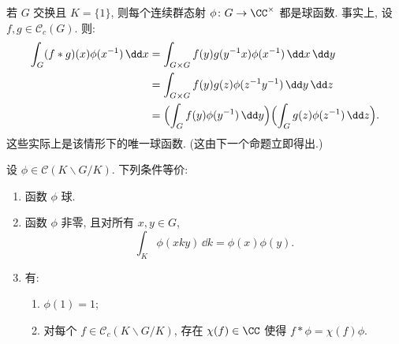 \begin{example}[交换群的情形]
\label{exa:V.4.2}
若 $G$ 交换且 $K = \{1\}$, 则每个连续群态射 $\phi \colon G \to \CC^{\times}$ 都是球函数. 事实上, 设 $f, g \in \mathcal{C}_c(G)$. 则:
\begin{align*}
\int_G (f * g)(x)\phi(x^{-1})\,\dd x &= \int_{G \times G}f(y)g(y^{-1}x)\phi(x^{-1})\,\dd x\,\dd y \\
&= \int_{G \times G}f(y)g(z)\phi(z^{-1}y^{-1})\,\dd y\,\dd z \\
&= \Bigl(\int_G f(y)\phi(y^{-1})\,\dd y\Bigr)\Bigl(\int_G g(z)\phi(z^{-1})\,\dd z\Bigr).
\end{align*}
这些实际上是该情形下的唯一球函数. (这由下一个命题立即得出.)
\end{example}

\begin{proposition}[球函数的刻画]
\label{prop:V.4.3}
设 $\phi \in \mathcal{C}(K\backslash G/K)$. 下列条件等价:
\begin{enumerate}
\item[(i)] 函数 $\phi$ 球.
\item[(ii)] 函数 $\phi$ 非零, 且对所有 $x, y \in G$,
\[
\int_K\phi(xky)\,\dd k = \phi(x)\phi(y).
\]
\item[(iii)] 有:
\begin{enumerate}
\item[(a)] $\phi(1) = 1$;
\item[(b)] 对每个 $f \in \mathcal{C}_c(K\backslash G/K)$, 存在 $\chi(f) \in \CC$ 使得 $f * \phi = \chi(f)\phi$.
\end{enumerate}
\end{enumerate}
\end{proposition}

